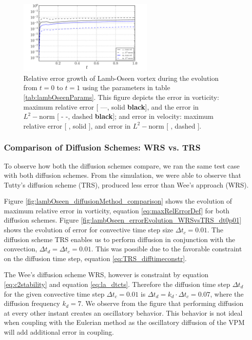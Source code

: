 	\begin{figure}[!t]
	\centering
	\includegraphics[width=0.6\textwidth]{figures/lagrangian/lambOseen_errorEvolution_TRS_dt0p01.pdf}
	\caption{Relative error growth of Lamb-Oseen vortex during the evolution from $t=0$ to $t=1$ using the parameters in table \ref{tab:lambOseenParams}. This figure depicts the error in vorticity: maximum relative error [ ---, solid \textbf{black}], and the error in $L^2-\mathrm{norm}$ [ - -, dashed \textbf{black}]; and error in velocity: maximum relative error [ {\color{plotBlue}{---}}, solid {}], and error in $L^2-\mathrm{norm}$ [ {\color{plotBlue}{- -}}, dashed {}].}
	\label{fig:lambOseen_convection_errorGrowth_compressed}
	\end{figure}
	
\subsubsection{Comparison of Diffusion Schemes: WRS vs. TRS}
\label{subsubsec:comp_wrs_trs}
To observe how both the diffusion schemes compare, we ran the same test case with both diffusion schemes. From the simulation, we were able to observe that Tutty's diffusion scheme (TRS), produced less error than Wee's approach (WRS). 

Figure \ref{fig:lambOseen_diffusionMethod_comparison} shows the evolution of maximum relative error in vorticity, equation \ref{eq:maxRelErrorDef} for both diffusion schemes. Figure \ref{fig:lambOseen_errorEvolution_WRSvsTRS_dt0p01} shows the evolution of error for convective time step size $\Delta t_c = 0.01$. The diffusion scheme TRS enables us to perform diffusion in conjunction with the convection, $\Delta t_d = \Delta t_c = 0.01$. This was possible due to the favorable constraint on the diffusion time step, equation \ref{eq:TRS_difftimeconstr}.

The Wee's diffusion scheme WRS, however is constraint by equation \ref{eq:c2stability} and equation \ref{eq:la_dtcts}. Therefore the diffusion time step $\Delta t_d$ for the given convective time step $\Delta t_c = 0.01$ is $\Delta t_d = k_d \cdot \Delta t_c = 0.07$, where the diffusion frequency $k_d=7$. We observe from the figure that performing diffusion at every other instant creates an oscillatory behavior. This behavior is not ideal when coupling with the Eulerian method as the oscillatory diffusion of the VPM will add additional error in coupling.

